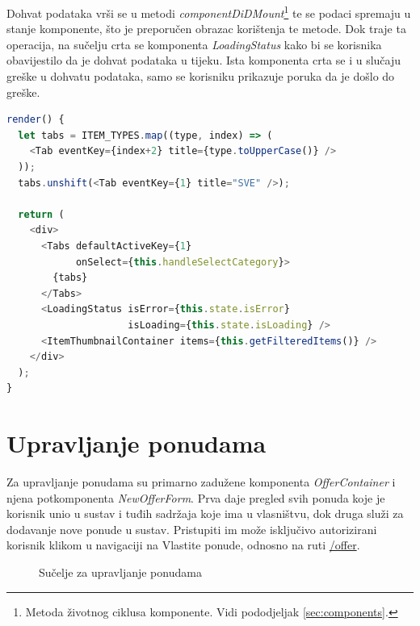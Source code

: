 \documentclass[times, utf8, zavrsni, numeric]{fer}
\newcommand{\razmakp}{\vspace{18pt}}
\newcommand{\razmaks}{\vspace{10pt}}
\begin{document}
Dohvat podataka vrši se u metodi \emph{componentDiDMount}\footnote{Metoda životnog ciklusa komponente. Vidi pododjeljak \ref{sec:components}.} te se podaci spremaju u stanje komponente, što je preporučen obrazac korištenja te metode\citep{reactDocsComponent}.
Dok traje ta operacija, na sučelju crta se komponenta \emph{LoadingStatus} kako bi se korisnika obavijestilo da je dohvat podataka u tijeku.
Ista komponenta crta se i u slučaju greške u dohvatu podataka, samo se korisniku prikazuje poruka da je došlo do greške.

\razmakp
\begin{lstlisting}[language=JavaScript, caption={Metoda \emph{render} komponente \emph{Main}}, label={lst:main_render}]
render() {
  let tabs = ITEM_TYPES.map((type, index) => (
    <Tab eventKey={index+2} title={type.toUpperCase()} />
  ));
  tabs.unshift(<Tab eventKey={1} title="SVE" />);

  return (
    <div>
      <Tabs defaultActiveKey={1}
            onSelect={this.handleSelectCategory}>
        {tabs}
      </Tabs>
      <LoadingStatus isError={this.state.isError}
                     isLoading={this.state.isLoading} />
      <ItemThumbnailContainer items={this.getFilteredItems()} />
    </div>
  );
}
\end{lstlisting}
\razmaks

\newpage


\section{Upravljanje ponudama}

Za upravljanje ponudama su primarno zadužene komponenta \emph{OfferContainer} i njena potkomponenta \emph{NewOfferForm}.
Prva daje pregled svih ponuda koje je korisnik unio u sustav i tuđih sadržaja koje ima u vlasništvu, dok druga služi za dodavanje nove ponude u sustav.
Pristupiti im može isključivo autorizirani korisnik klikom u navigaciji na \glqq Vlastite ponude\grqq , odnosno na ruti \glqq \url{/offer}\grqq .

\razmaks

\begin{figure}[htb]
\centering
{}
\caption{Sučelje za upravljanje ponudama}
\label{fig:screenshot-offer}
\end{figure}
\end{document}
